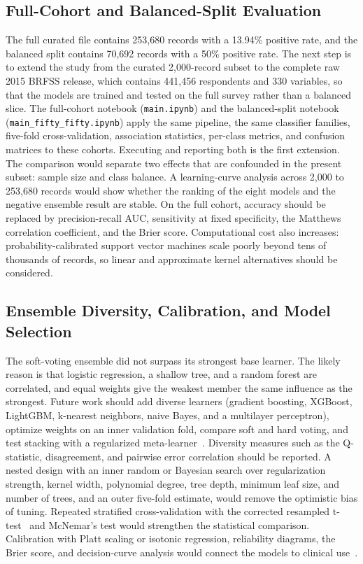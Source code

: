 \documentclass[conference]{IEEEtran}
\begin{document}
\subsection{Full-Cohort and Balanced-Split Evaluation}

The full curated file contains 253,680 records with a 13.94\% positive rate, and the balanced split contains 70,692 records with a 50\% positive rate. The next step is to extend the study from the curated 2,000-record subset to the complete raw 2015 BRFSS release, which contains 441,456 respondents and 330 variables, so that the models are trained and tested on the full survey rather than a balanced slice. The full-cohort notebook (\texttt{main.ipynb}) and the balanced-split notebook (\texttt{main\_fifty\_fifty.ipynb}) apply the same pipeline, the same classifier families, five-fold cross-validation, association statistics, per-class metrics, and confusion matrices to these cohorts. Executing and reporting both is the first extension. The comparison would separate two effects that are confounded in the present subset: sample size and class balance. A learning-curve analysis across 2,000 to 253,680 records would show whether the ranking of the eight models and the negative ensemble result are stable. On the full cohort, accuracy should be replaced by precision-recall AUC, sensitivity at fixed specificity, the Matthews correlation coefficient, and the Brier score. Computational cost also increases: probability-calibrated support vector machines scale poorly beyond tens of thousands of records, so linear and approximate kernel alternatives should be considered.

\subsection{Ensemble Diversity, Calibration, and Model Selection}

The soft-voting ensemble did not surpass its strongest base learner. The likely reason is that logistic regression, a shallow tree, and a random forest are correlated, and equal weights give the weakest member the same influence as the strongest. Future work should add diverse learners (gradient boosting, XGBoost, LightGBM, k-nearest neighbors, naive Bayes, and a multilayer perceptron), optimize weights on an inner validation fold, compare soft and hard voting, and test stacking with a regularized meta-learner~\cite{wolpert1992stacked}. Diversity measures such as the Q-statistic, disagreement, and pairwise error correlation should be reported. A nested design with an inner random or Bayesian search over regularization strength, kernel width, polynomial degree, tree depth, minimum leaf size, and number of trees, and an outer five-fold estimate, would remove the optimistic bias of tuning. Repeated stratified cross-validation with the corrected resampled t-test~\cite{dietterich1998approximate} and McNemar's test would strengthen the statistical comparison. Calibration with Platt scaling or isotonic regression, reliability diagrams, the Brier score, and decision-curve analysis would connect the models to clinical use~\cite{dellacorte2025calibration}.
\end{document}
